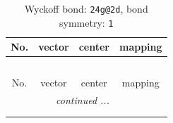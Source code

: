 \documentclass[fleqn,8pt]{jsarticle}
\begin{document}
\renewcommand{\arraystretch}{1.2}
\begin{longtable}{cccc}
\caption{Wyckoff bond: {\tt 24g@2d}, bond symmetry: {\tt 1}}
 \\
 \hline \hline
No. & vector & center & mapping \\ \hline \endfirsthead

\multicolumn{3}{l}{\tablename\ \thetable{}} \\
 \hline \hline
No. & vector & center & mapping \\ \hline \endhead

 \hline \hline
\multicolumn{3}{r}{\footnotesize\it continued ...} \\ \endfoot

 \hline \hline
\multicolumn{3}{r}{} \\ \endlastfoot


\end{longtable}
\end{document}
